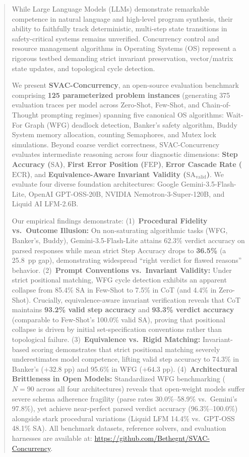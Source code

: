 \documentclass[conference]{IEEEtran}
\newcommand{\SA}{\text{SA}}
\newcommand{\FEP}{\text{FEP}}
\newcommand{\ECR}{\text{ECR}}
\newcommand{\SAvalid}{\text{SA}_{\text{valid}}}
\begin{document}
\begin{abstract}
While Large Language Models (LLMs) demonstrate remarkable competence in natural language
and high-level program synthesis, their ability to faithfully track deterministic,
multi-step state transitions in safety-critical systems remains unverified. Concurrency
control and resource management algorithms in Operating Systems (OS) represent a rigorous
testbed demanding strict invariant preservation, vector/matrix state updates, and topological
cycle detection.

We present \textbf{SVAC-Concurrency}, an open-source evaluation benchmark comprising
\textbf{125 parameterized problem instances} (generating 375 evaluation traces per model
across Zero-Shot, Few-Shot, and Chain-of-Thought prompting regimes) spanning five canonical
OS algorithms: Wait-For Graph (WFG) deadlock detection, Banker's safety algorithm, Buddy
System memory allocation, counting Semaphores, and Mutex lock simulations. Beyond coarse
verdict correctness, SVAC-Concurrency evaluates intermediate reasoning across four diagnostic
dimensions: \textbf{Step Accuracy ($\SA$)}, \textbf{First Error Position ($\FEP$)},
\textbf{Error Cascade Rate ($\ECR$)}, and \textbf{Equivalence-Aware Invariant Validity ($\SAvalid$)}.
We evaluate four diverse foundation architectures: Google Gemini-3.5-Flash-Lite, OpenAI
GPT-OSS-20B, NVIDIA Nemotron-3-Super-120B, and Liquid AI LFM-2.6B.

Our empirical findings demonstrate: (1)~\textbf{Procedural Fidelity vs.\ Outcome Illusion:}
On non-saturating algorithmic tasks (WFG, Banker's, Buddy), Gemini-3.5-Flash-Lite attains
62.3\% verdict accuracy on parsed responses while mean strict Step Accuracy drops to
\textbf{36.5\%} (a 25.8~pp gap), demonstrating widespread ``right verdict for flawed reasons''
behavior. (2)~\textbf{Prompt Conventions vs.\ Invariant Validity:} Under strict positional
matching, WFG cycle detection exhibits an apparent collapse from 85.4\% SA in Few-Shot to
7.5\% in CoT (and 4.4\% in Zero-Shot). Crucially, equivalence-aware invariant verification
reveals that CoT maintains \textbf{93.2\% valid step accuracy} and \textbf{93.3\% verdict accuracy}
(comparable to Few-Shot's 100.0\% valid SA), proving that positional collapse is driven by
initial set-specification conventions rather than topological failure. (3)~\textbf{Equivalence
vs.\ Rigid Matching:} Invariant-based scoring demonstrates that strict positional matching
severely underestimates model competence, lifting valid step accuracy to 74.3\% in Banker's
($+32.8\text{ pp}$) and 95.6\% in WFG ($+64.3\text{ pp}$). (4)~\textbf{Architectural Brittleness
in Open Models:} Standardized WFG benchmarking ($N=90$ across all four architectures) reveals
that open-weight models suffer severe schema adherence fragility (parse rates 30.0\%--58.9\%
vs.\ Gemini's 97.8\%), yet achieve near-perfect parsed verdict accuracy (96.3\%--100.0\%) alongside
stark procedural variations (Liquid LFM 14.4\% vs.\ GPT-OSS 48.1\% SA). All benchmark datasets,
reference solvers, and evaluation harnesses are available at:
\url{https://github.com/Bethegnt/SVAC-Concurrency}.
\end{abstract}
\end{document}
